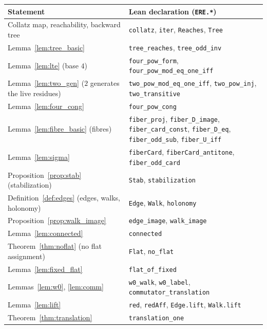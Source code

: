 \documentclass[11pt,reqno,oneside]{amsart}
\theoremstyle{plain}
\theoremstyle{definition}
\numberwithin{equation}{section}
\begin{document}
\begin{center}
\footnotesize
\renewcommand{\arraystretch}{1.1}
\begin{tabular}{@{}>{\raggedright\arraybackslash}p{}@{\hspace{1em}}>{\raggedright\arraybackslash}p{}@{}}
\toprule
\textbf{Statement} & \textbf{Lean declaration (\texttt{ERE.*})} \\
\midrule
Collatz map, reachability, backward tree & \texttt{collatz}, \texttt{iter}, \texttt{Reaches}, \texttt{Tree} \\
Lemma~\ref{lem:tree_basic} & \texttt{tree\_reaches}, \texttt{tree\_odd\_inv} \\
Lemma~\ref{lem:lte} (base $4$) & \texttt{four\_pow\_form}, \texttt{four\_pow\_mod\_eq\_one\_iff} \\
Lemma~\ref{lem:two_gen} ($2$ generates the live residues) & \texttt{two\_pow\_mod\_eq\_one\_iff}, \texttt{two\_pow\_inj}, \texttt{two\_transitive} \\
Lemma~\ref{lem:four_cong} & \texttt{four\_pow\_cong} \\
Lemma~\ref{lem:fibre_basic} (fibres) & \texttt{fiber\_proj}, \texttt{fiber\_D\_image}, \texttt{fiber\_card\_const}, \texttt{fiber\_D\_eq}, \texttt{fiber\_odd\_sub}, \texttt{fiber\_U\_iff} \\
Lemma~\ref{lem:sigma} & \texttt{fiberCard}, \texttt{fiberCard\_antitone}, \texttt{fiber\_odd\_card} \\
Proposition~\ref{prop:stab} (stabilization) & \texttt{Stab}, \texttt{stabilization} \\
Definition~\ref{def:edges} (edges, walks, holonomy) & \texttt{Edge}, \texttt{Walk}, \texttt{holonomy} \\
Proposition~\ref{prop:walk_image} & \texttt{edge\_image}, \texttt{walk\_image} \\
Lemma~\ref{lem:connected} & \texttt{connected} \\
Theorem~\ref{thm:noflat} (no flat assignment) & \texttt{Flat}, \texttt{no\_flat} \\
Lemma~\ref{lem:fixed_flat} & \texttt{flat\_of\_fixed} \\
Lemmas~\ref{lem:w0}, \ref{lem:comm} & \texttt{w0\_walk}, \texttt{w0\_label}, \texttt{commutator\_translation} \\
Lemma~\ref{lem:lift} & \texttt{red}, \texttt{redAff}, \texttt{Edge.lift}, \texttt{Walk.lift} \\
Theorem~\ref{thm:translation} & \texttt{translation\_one} \\

\end{tabular}
\end{center}
\end{document}

